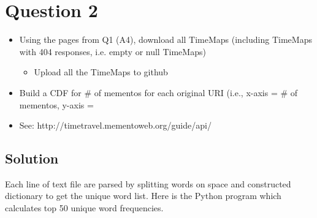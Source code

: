 
\section{Question 2}
\label{part2}
\begin{itemize} 
\item Using the pages from Q1 (A4), download all TimeMaps (including TimeMaps with 404 responses, i.e. empty or null TimeMaps) 
\begin{itemize}
\item Upload all the TimeMaps to github
\end{itemize}

\item Build a CDF for # of mementos for each original URI (i.e., x-axis = # of mementos, y-axis = %
\item See: http://timetravel.mementoweb.org/guide/api/ 

\end{itemize}
\subsection{Solution}

Each line of text file are parsed by splitting words on space and constructed dictionary to get the unique word list.
Here is the Python program which calculates top 50 unique word frequencies.

